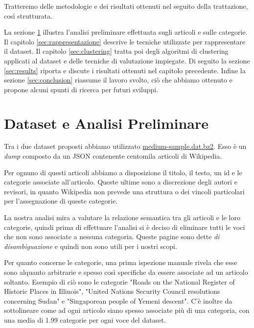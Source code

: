 \documentclass[
	11pt, %
	a4paper, %
	oneside, %
	headinclude,footinclude, %
	BCOR5mm, %
]{scrartcl}
\begin{document}
Tratteremo delle metodologie e dei risultati ottenuti nel seguito della trattazione, così strutturata.

La sezione \ref{sec:dataset} illustra l'analisi preliminare effettuata sugli articoli e sulle categorie.
Il capitolo \ref{sec:rappresentazione} descrive le tecniche utilizzate per rappresentare il dataset.
Il capitolo \ref{sec:clustering} tratta poi degli algoritmi di clustering applicati al dataset e delle tecniche di valutazione impiegate.
Di seguito la sezione \ref{sec:results} riporta e discute i risultati ottenuti nel capitolo precedente.
Infine la sezione \ref{sec:conclusion} riassume il lavoro svolto, ciò che abbiamo ottenuto e propone alcuni spunti di ricerca per futuri sviluppi.

\section{Dataset e Analisi Preliminare} \label{sec:dataset}
	Tra i due dataset proposti abbiamo utilizzato \url{medium-sample.dat.bz2}. Esso è un \emph{dump} composto da un JSON contenente centomila articoli di Wikipedia.
	
	Per ognuno di questi articoli abbiamo a disposizione il titolo, il testo, un id e le categorie associate all'articolo. 
	Queste ultime sono a discrezione degli autori e revisori, in quanto Wikipedia non prevede una struttura o dei vincoli particolari per l'assegnazione di queste categorie.

	La nostra analisi mira a valutare la relazione semantica tra gli articoli e le loro categorie, quindi prima di effettuare l'analisi si è deciso di eliminare tutti le voci che non sono associate a nessuna categoria. Queste pagine sono dette \emph{di disambiguazione} e quindi non sono utili per i nostri scopi.

	Per quanto concerne le categorie, una prima ispezione manuale rivela che esse sono alquanto arbitrarie e spesso così specifiche da essere associate ad un articolo soltanto.
	Esempio di ciò sono le categorie "Roads on the National Register of Historic Places in Illinois", "United Nations Security Council resolutions concerning Sudan" e "Singaporean people of Yemeni descent".
	C'è inoltre da sottolineare come ad ogni articolo siano spesso associate più di una categoria, con una media di 1.99 categorie per ogni voce del dataset.
\end{document}
